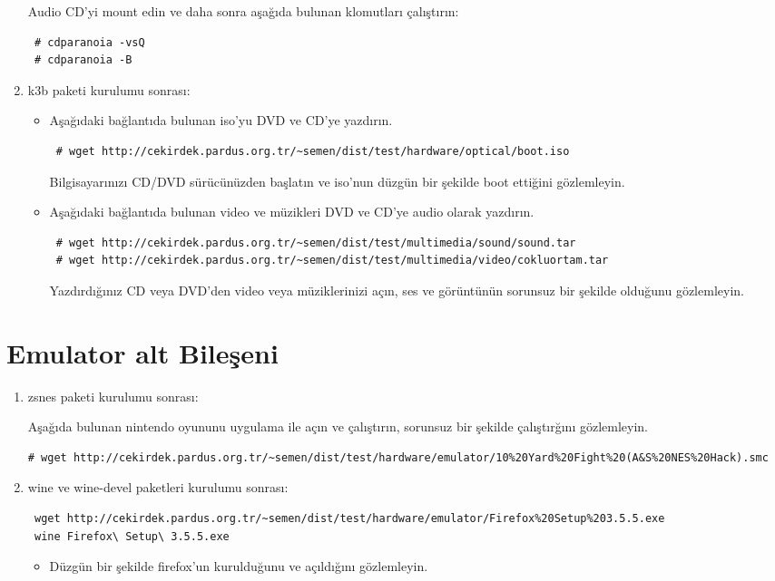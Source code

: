 \documentclass[a4paper,10pt]{article}
\begin{document}
\begin{enumerate}
Audio CD'yi mount edin ve daha sonra aşağıda bulunan klomutları çalıştırın:
\begin{verbatim}
 # cdparanoia -vsQ
 # cdparanoia -B
\end{verbatim}

\item k3b paketi kurulumu sonrası:
\begin{itemize}
\item Aşağıdaki bağlantıda bulunan iso'yu DVD ve CD'ye yazdırın. 
\begin{verbatim}
 # wget http://cekirdek.pardus.org.tr/~semen/dist/test/hardware/optical/boot.iso
\end{verbatim}

Bilgisayarınızı CD/DVD sürücünüzden başlatın ve iso'nun düzgün bir şekilde boot ettiğini gözlemleyin.

\item Aşağıdaki bağlantıda bulunan video ve müzikleri DVD ve CD'ye audio olarak yazdırın. 
\begin{verbatim}
 # wget http://cekirdek.pardus.org.tr/~semen/dist/test/multimedia/sound/sound.tar
 # wget http://cekirdek.pardus.org.tr/~semen/dist/test/multimedia/video/cokluortam.tar
\end{verbatim}
Yazdırdığınız CD veya DVD'den video veya müziklerinizi açın, ses ve görüntünün sorunsuz bir şekilde olduğunu gözlemleyin.

\end{itemize}

\end{enumerate}
\section{Emulator alt Bileşeni}
\begin{enumerate}
 \item zsnes paketi kurulumu sonrası:

Aşağıda bulunan nintendo oyununu uygulama ile açın ve çalıştırın, sorunsuz bir şekilde çalıştırğını gözlemleyin.
\begin{verbatim}
# wget http://cekirdek.pardus.org.tr/~semen/dist/test/hardware/emulator/10%20Yard%20Fight%20(A&S%20NES%20Hack).smc 
\end{verbatim}

 \item wine ve wine-devel paketleri kurulumu sonrası:
\begin{verbatim}
 wget http://cekirdek.pardus.org.tr/~semen/dist/test/hardware/emulator/Firefox%20Setup%203.5.5.exe
 wine Firefox\ Setup\ 3.5.5.exe
\end{verbatim}
\begin{itemize}
 \item Düzgün bir şekilde firefox'un kurulduğunu ve açıldığını gözlemleyin.
 \end{itemize}

\end{enumerate}
\end{document}
